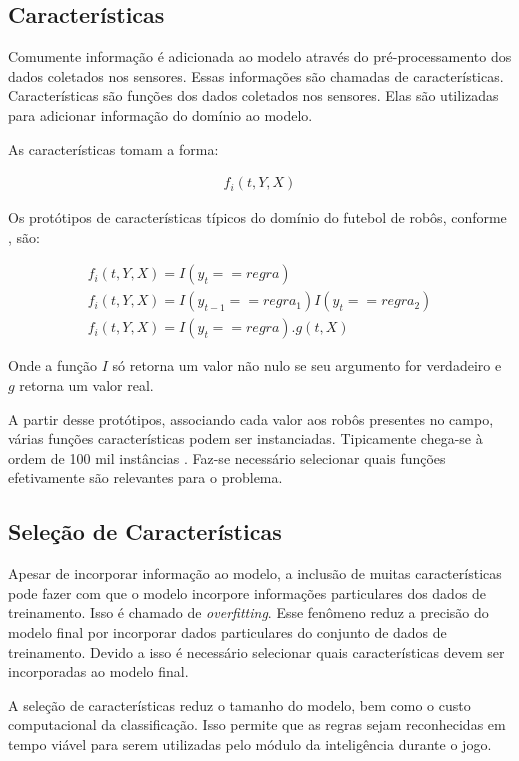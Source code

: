 \subsection{Características}

Comumente informação é adicionada ao modelo através do pré-processamento dos
dados coletados nos sensores. Essas informações são chamadas de características.
Características são funções dos dados coletados nos sensores. Elas são utilizadas
para adicionar informação do domínio ao modelo.

As características tomam a forma:

\begin{gather}
f_i(t,Y,X)
\end{gather}

Os protótipos de características típicos do domínio do futebol de robôs,
conforme \cite{vail2008crf}, são:

\begin{gather}
f_i(t,Y,X)=I(y_t == regra)\\
f_i(t,Y,X)=I(y_{t-1} == regra_1)I(y_t == regra_2)\\
f_i(t,Y,X)=I(y_t == regra).g(t,X)
\end{gather}

Onde a função $I$ só retorna um valor não nulo se seu argumento for verdadeiro e
$g$ retorna um valor real.

A partir desse protótipos, associando cada valor aos robôs presentes
no campo, várias funções características podem ser instanciadas.
Tipicamente chega-se à ordem de 100 mil instâncias \cite{vail2008crf}. Faz-se necessário
selecionar quais funções efetivamente são relevantes para o problema.

\subsection{Seleção de Características}

Apesar de incorporar informação ao modelo, a inclusão de muitas características
pode fazer com que o modelo incorpore informações particulares dos dados de
treinamento. Isso é chamado de \textit{overfitting}. Esse fenômeno reduz a precisão
do modelo final por incorporar dados particulares do conjunto de dados de
treinamento. Devido a isso é necessário selecionar quais características devem
ser incorporadas ao modelo final.

A seleção de características reduz o tamanho do modelo, bem como o custo
computacional da classificação. Isso permite que as regras sejam reconhecidas
em tempo viável para serem utilizadas pelo módulo da inteligência durante o
jogo.
